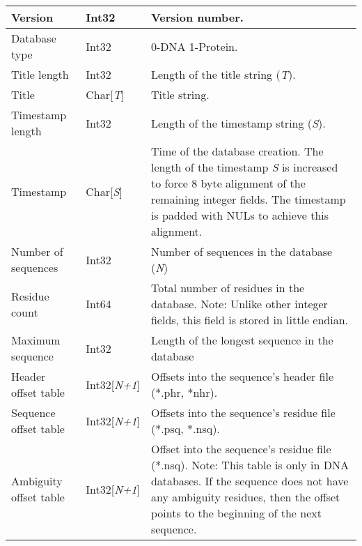 \bigskip
\begin{center}
\begin{tabular}{|l|l|p{3.5in}|} \hline
Version &
Int32 &
Version number. \\ \hline
Database type &
Int32 &
0-DNA 1-Protein.  \\ \hline
Title length &
Int32 &
Length of the title string (\emph{T}).  \\ \hline
Title &
Char[\emph{T}] &
Title string.  \\ \hline
Timestamp length &
Int32 &
Length of the timestamp string (\emph{S}).  \\ \hline
Timestamp &Char[\emph{S}] &
Time of the database creation.  The length of the timestamp \emph{S} is 
increased to force 8 byte alignment of the remaining integer 
fields.  The timestamp is padded with NULs to achieve this alignment.   \\ \hline
Number of sequences &
Int32 &
Number of sequences in the database (\emph{N})  \\ \hline
Residue count &
Int64 &
Total number of residues in the database.  Note:  Unlike other integer 
fields, this field is stored in little endian.  \\ \hline
Maximum sequence &
Int32 &
Length of the longest sequence in the database  \\ \hline
Header offset table &
Int32[\emph{N+1}] &
Offsets into the sequence's header file (*.phr, *nhr). \\ \hline
Sequence offset table &
Int32[\emph{N+1}] &
Offsets into the sequence's residue file (*.psq, *.nsq). \\ \hline
Ambiguity offset table &
Int32[\emph{N+1}] &
Offset into the sequence's residue file (*.nsq).  Note: This table is only 
in DNA databases.  If the sequence does not have any ambiguity 
residues, then the offset points to the beginning of the next 
sequence.  \\ \hline
\end{tabular}
\end{center}
\bigskip

